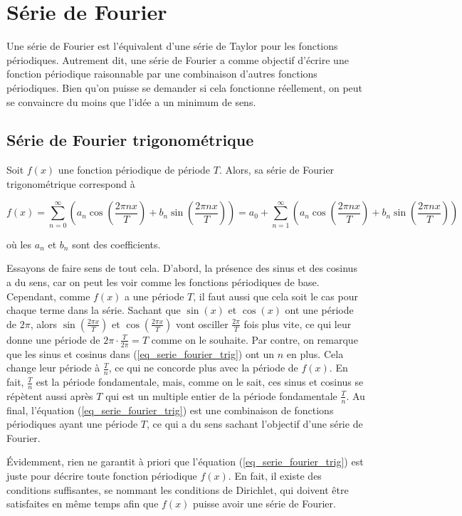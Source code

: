 \newpage
\section{Série de Fourier}
Une série de Fourier est l'équivalent d'une série de Taylor pour les fonctions périodiques. Autrement dit, une série de Fourier a comme objectif d'écrire une fonction périodique raisonnable par une combinaison d'autres fonctions périodiques. Bien qu'on puisse se demander si cela fonctionne réellement, on peut se convaincre du moins que l'idée a un minimum de sens.

\subsection{Série de Fourier trigonométrique}
Soit $f(x)$ une fonction périodique de période $T$. Alors, sa série de Fourier trigonométrique correspond à

\begin{equation}
    f(x) = \sum_{n=0}^{\infty}\left(a_n\cos(\frac{2\pi n x}{T}) + b_n\sin(\frac{2\pi n x}{T})\right) = a_0 + \sum_{n=1}^{\infty}\left(a_n\cos(\frac{2\pi n x}{T}) + b_n\sin(\frac{2\pi n x}{T})\right)
    \label{eq_serie_fourier_trig}
\end{equation}

où les $a_n$ et $b_n$ sont des coefficients.

Essayons de faire sens de tout cela. D'abord, la présence des sinus et des cosinus a du sens, car on peut les voir comme les fonctions périodiques de base. Cependant, comme $f(x)$ a une période $T$, il faut aussi que cela soit le cas pour chaque terme dans la série. Sachant que $\sin(x)$ et $\cos(x)$ ont une période de $2\pi$, alors $\sin(\frac{2\pi x}{T})$ et $\cos(\frac{2\pi x}{T})$ vont osciller $\frac{2\pi}{T}$ fois plus vite, ce qui leur donne une période de $2\pi \cdot \frac{T}{2\pi} = T$ comme on le souhaite. Par contre, on remarque que les sinus et cosinus dans (\ref{eq_serie_fourier_trig}) ont un $n$ en plus. Cela change leur période à $\frac{T}{n}$, ce qui ne concorde plus avec la période de $f(x)$. En fait, $\frac{T}{n}$ est la période fondamentale, mais, comme on le sait, ces sinus et cosinus se répètent aussi après $T$ qui est un multiple entier de la période fondamentale $\frac{T}{n}$. Au final, l'équation (\ref{eq_serie_fourier_trig}) est une combinaison de fonctions périodiques ayant une période $T$, ce qui a du sens sachant l'objectif d'une série de Fourier.

Évidemment, rien ne garantit à priori que l'équation (\ref{eq_serie_fourier_trig}) est juste pour décrire toute fonction périodique $f(x)$. En fait, il existe des conditions suffisantes, se nommant les conditions de Dirichlet, qui doivent être satisfaites en même temps afin que $f(x)$ puisse avoir une série de Fourier. 

